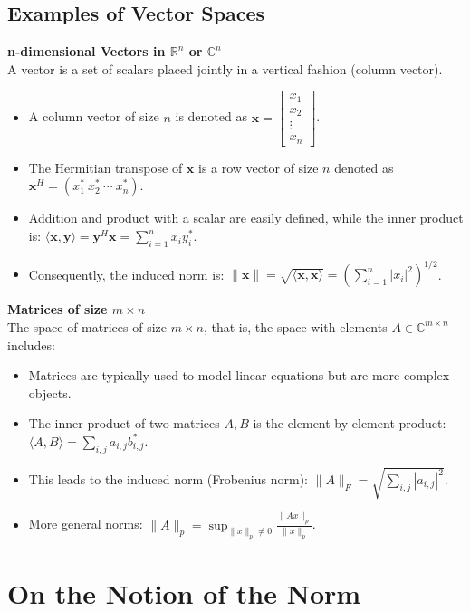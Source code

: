 \subsection*{Examples of Vector Spaces}
\textbf{n-dimensional Vectors in \( \mathbb{R}^n \) or \( \mathbb{C}^n \)}\\
A vector is a set of scalars placed jointly in a vertical fashion (column vector).
\begin{itemize}
    \item A column vector of size \( n \) is denoted as \( \mathbf{x} = \begin{bmatrix} x_1 \\ x_2 \\ \vdots \\ x_n \end{bmatrix} \).
    \item The Hermitian transpose of \( \mathbf{x} \) is a row vector of size \( n \) denoted as \( \mathbf{x}^H = (x_1^* \ x_2^* \ \cdots \ x_n^*) \).
    \item Addition and product with a scalar are easily defined, while the inner product is: \( \langle \mathbf{x}, \mathbf{y} \rangle = \mathbf{y}^H \mathbf{x} = \sum_{i=1}^{n} x_i y_i^* \).
    \item Consequently, the induced norm is: \( \|\mathbf{x}\| = \sqrt{\langle \mathbf{x}, \mathbf{x} \rangle} = \left( \sum_{i=1}^{n} |x_i|^2 \right)^{1/2} \).
\end{itemize}
\textbf{Matrices of size \( m \times n \)}\\
The space of matrices of size \( m \times n \), that is, the space with elements \( A \in \mathbb{C}^{m \times n} \) includes:
\begin{itemize}
    \item Matrices are typically used to model linear equations but are more complex objects.
    \item The inner product of two matrices \( A, B \) is the element-by-element product: \( \langle A, B \rangle = \sum_{i,j} a_{i,j} b_{i,j}^* \).
    \item This leads to the induced norm (Frobenius norm): \( \|A\|_F = \sqrt{\sum_{i,j} |a_{i,j}|^2} \).
    \item More general norms: \( \|A\|_p = \sup_{\|x\|_p \neq 0} \frac{\|Ax\|_p}{\|x\|_p} \).
\end{itemize}

\newpage
\section*{On the Notion of the Norm}

